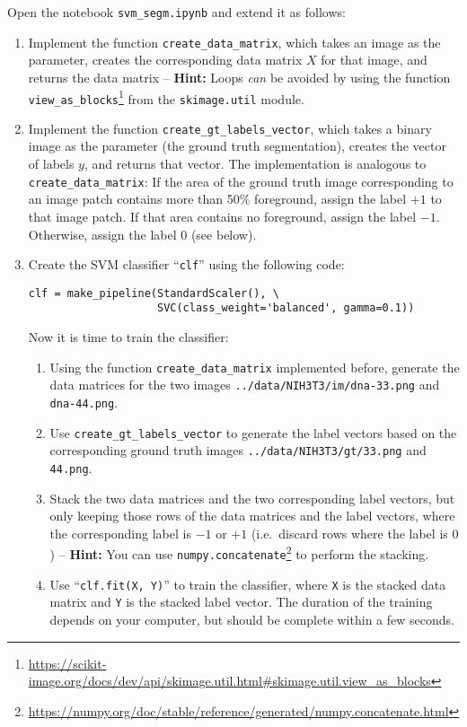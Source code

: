 \documentclass[12pt,a4paper]{article}
\begin{document}
Open the notebook \texttt{svm\_segm.ipynb} and extend it as follows:
\begin{enumerate}
    \item Implement the function \texttt{create\_data\_matrix}, which takes an image as the parameter, creates the corresponding data matrix $X$ for that image, and returns the data matrix -- \textbf{Hint:} Loops \emph{can} be avoided by using the function \texttt{view\_as\_blocks}\footnote{\mbox{\url{https://scikit-image.org/docs/dev/api/skimage.util.html\#skimage.util.view\_as\_blocks}}} from the \texttt{skimage.util} module.
    \item Implement the function \texttt{create\_gt\_labels\_vector}, which takes a binary image as the parameter (the ground truth segmentation), creates the vector of labels $y$, and returns that vector. The implementation is analogous to \texttt{create\_data\_matrix}: If the area of the ground truth image corresponding to an image patch contains more than 50\% foreground, assign the label $+1$ to that image patch. If that area contains no foreground, assign the label $-1$. Otherwise, assign the label $0$ (see below).
    \item Create the SVM classifier ``\texttt{clf}'' using the following code:
\begin{Verbatim}[frame=single]
clf = make_pipeline(StandardScaler(), \
                    SVC(class_weight='balanced', gamma=0.1))
\end{Verbatim}
    Now it is time to train the classifier:
    \begin{enumerate}
        \item Using the function \texttt{create\_data\_matrix} implemented before, generate the data matrices for the two images \texttt{../data/NIH3T3/im/dna-33.png} and \texttt{dna-44.png}.
        \item Use \texttt{create\_gt\_labels\_vector} to generate the label vectors based on the corresponding ground truth images \texttt{../data/NIH3T3/gt/33.png} and \texttt{44.png}.
        \item Stack the two data matrices and the two corresponding label vectors, but only keeping those rows of the data matrices and the label vectors, where the corresponding label is $-1$ or $+1$ (i.e.\ discard rows where the label is $0$) -- \textbf{Hint:} You can use \texttt{numpy.concatenate}\footnote{\mbox{\url{https://numpy.org/doc/stable/reference/generated/numpy.concatenate.html}}} to perform the stacking.
        \item Use ``\texttt{clf.fit(X, Y)}'' to train the classifier, where \texttt{X} is the stacked data matrix and \texttt{Y} is the stacked label vector. The duration of the training depends on your computer, but should be complete within a few seconds.

\end{enumerate}
\end{enumerate}
\end{document}
